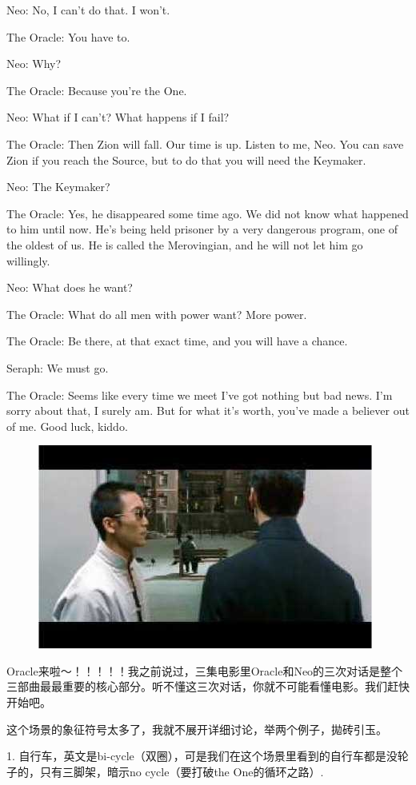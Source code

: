 \documentclass{ctexart}
\newenvironment{myquote}{\color{green} \setlength{\leftskip}{6em} \setlength{\rightskip}{4em} \setlength{\parindent}{-2em}}{\par}
\begin{document}
\begin{myquote}
Neo: No, I can't do that. I won't.

The Oracle: You have to.

Neo: Why?

The Oracle: Because you're the One.

Neo: What if I can't? What happens if I fail?

The Oracle: Then Zion will fall. Our time is up. Listen to me, Neo. You can save Zion if you reach the Source, but to do that you will need the Keymaker.

Neo: The Keymaker?

The Oracle: Yes, he disappeared some time ago. We did not know what happened to him until now. He's being held prisoner by a very dangerous program, one of the oldest of us. He is called the Merovingian, and he will not let him go willingly.

Neo: What does he want?

The Oracle: What do all men with power want? More power.

The Oracle: Be there, at that exact time, and you will have a chance.

Seraph: We must go.

The Oracle: Seems like every time we meet I've got nothing but bad news. I'm sorry about that, I surely am. But for what it's worth, you've made a believer out of me. Good luck, kiddo.
\end{myquote}

\begin{figure}[htb]
\centering
\includegraphics[width=0.5\linewidth]{fig/read_reloaded-64}
\end{figure}

Oracle来啦～！！！！！我之前说过，三集电影里Oracle和Neo的三次对话是整个三部曲最最重要的核心部分。听不懂这三次对话，你就不可能看懂电影。我们赶快开始吧。

这个场景的象征符号太多了，我就不展开详细讨论，举两个例子，拋砖引玉。

1. 自行车，英文是bi-cycle（双圈），可是我们在这个场景里看到的自行车都是没轮子的，只有三脚架，暗示no cycle（要打破the One的循环之路）.
\end{document}
